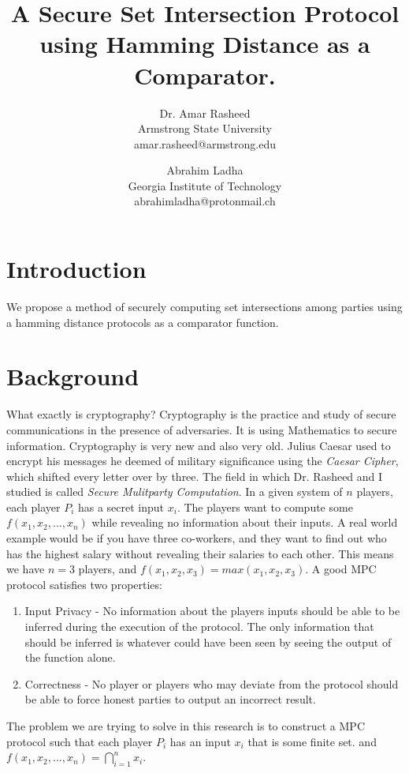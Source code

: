 \documentclass[10pt]{article}
\begin{document}
\title{A Secure Set Intersection Protocol using Hamming Distance as a Comparator.}
\author{Dr. Amar Rasheed\\ Armstrong State University\\amar.rasheed@armstrong.edu \and Abrahim Ladha\\ Georgia Institute of Technology\\ abrahimladha@protonmail.ch}
\maketitle


\newpage

\section{Introduction}
We propose a method of securely computing set intersections among parties using a hamming distance protocols as a comparator function. 
\section{Background}

What exactly is cryptography? Cryptography is the practice and study of secure communications in the presence of adversaries. It is using Mathematics to secure information. Cryptography is very new and also very old. Julius Caesar used to encrypt his messages he deemed of military significance using the \textit{Caesar Cipher}, which shifted every letter over by three. The field in which Dr. Rasheed and I studied is called \textit{Secure Mulitparty Computation}. In a given system of $n$ players, each player $P_i$ has a secret input $x_i$. The players want to compute some $f(x_1,x_2,...,x_n)$ while revealing no information about their inputs. A real world example would be if you have three co-workers, and they want to find out who has the highest salary without revealing their salaries to each other. This means we have $n=3$ players, and $f(x_1,x_2,x_3) = max(x_1,x_2,x_3)$. A good MPC protocol satisfies two properties:
\begin{enumerate}
\item Input Privacy - No information about the players inputs should be able to be inferred during the execution of the protocol. The only information that should be inferred is whatever could have been seen by seeing the output of the function alone.
\item Correctness - No player or players who may deviate from the protocol should be able to force honest parties to output an incorrect result.  
\end{enumerate} 
The problem we are trying to solve in this research is to construct a MPC protocol such that each player $P_i$ has an input $x_i$ that is some finite set. and $f(x_1,x_2,...,x_n) = \bigcap_{i=1}^n x_i$. 
\end{document}
